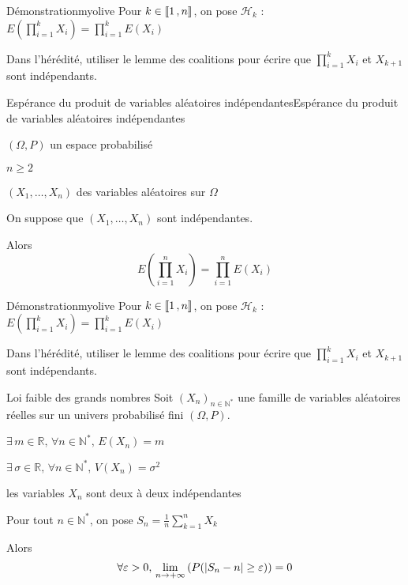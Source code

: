     \begin{demo}{Démonstration}{myolive}
        Pour $k \in \left\llbracket 1 \, , n \right\rrbracket$, on pose $\mathcal{H}_k$ : $E\left(\prod\limits_{i=1}^k X_i\right) = \prod\limits_{i=1}^k E(X_i)$

        Dans l’hérédité, utiliser le lemme des coalitions pour écrire que $\prod\limits_{i=1}^k X_i$ et $X_{k+1}$ sont indépendants.
    \end{demo}

    \begin{prop}{Espérance du produit de variables aléatoires indépendantes}{Espérance du produit de variables aléatoires indépendantes}
        \begin{soient}
            \item $(\Omega,P)$ un espace probabilisé
            \item $n \geq 2$
            \item $(X_1,\ldots,X_n)$ des variables aléatoires sur $\Omega$
        \end{soient}
        On suppose que $(X_1,\ldots,X_n)$ sont indépendantes.

        Alors 
        \[ E\left(\prod\limits_{i=1}^n X_i\right) = \prod\limits_{i=1}^n E(X_i) \] 
    \end{prop}

    \begin{demo}{Démonstration}{myolive}
        Pour $k \in \left\llbracket 1 \, , n \right\rrbracket$, on pose $\mathcal{H}_k$ : $E\left(\prod\limits_{i=1}^k X_i\right) = \prod\limits_{i=1}^k E(X_i)$

        Dans l’hérédité, utiliser le lemme des coalitions pour écrire que $\prod\limits_{i=1}^k X_i$ et $X_{k+1}$ sont indépendants.
    \end{demo}

    \begin{prop}{Loi faible des grands nombres}{}
        Soit $(X_n)_{n \in \mathbb{N}^*}$ une famille de variables aléatoires réelles sur un univers probabilisé fini $(\Omega,P)$.

        \begin{suppose}
           \item $\exists \, m \in \mathbb{R}, \, \forall n \in \mathbb{N}^*, \, E(X_n) = m$
           \item $\exists \, \sigma \in \mathbb{R}, \, \forall n \in \mathbb{N}^*, \, V(X_n) = \sigma^2$
           \item les variables $X_n$ sont deux à deux indépendantes
        \end{suppose}
        Pour tout $n \in \mathbb{N}^*$, on pose $S_n = \frac{1}{n} \sum\limits_{k=1}^n X_k$

        Alors \[ \forall \varepsilon > 0, \, \lim\limits_{n \rightarrow + \infty} \left(P(\left\lvert S_n-n\right\rvert \geq \varepsilon)\right) = 0 \] 
    \end{prop}

